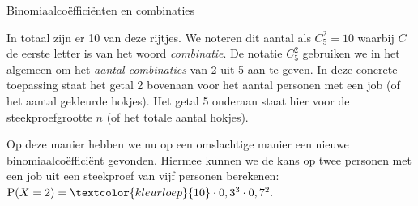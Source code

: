 \begin{lesactiviteit}{Binomiaalcoëfficiënten en combinaties}
\begin{vraagenantwoord}[resume]


\end{vraagenantwoord}

In totaal zijn er 10 van deze rijtjes. We noteren dit aantal als $C^2_5=10$ waarbij $C$ de eerste letter is van het woord \emph{combinatie}. De notatie  $C^2_5$ gebruiken we in het algemeen om het \emph{aantal combinaties} van 2 uit 5 aan te geven. In deze concrete toepassing staat het getal 2 bovenaan voor het aantal personen met een job (of het aantal gekleurde hokjes). Het getal 5 onderaan staat hier voor de steekproefgrootte $n$ (of het totale aantal hokjes). 

Op deze manier hebben we nu op een omslachtige manier een nieuwe binomiaalcoëfficiënt gevonden. Hiermee kunnen we de kans op twee personen met een job uit een steekproef van vijf personen berekenen: $\textrm{P}(X=2)=\textcolor{kleurloep}{10} \cdot 0,3^3 \cdot 0,7^2.$


\end{lesactiviteit}
